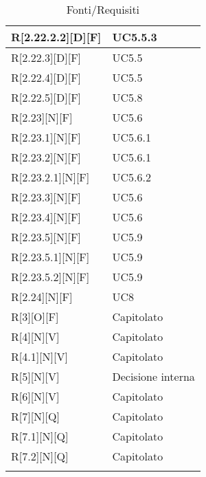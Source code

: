 \begin{longtable}{X | X}
\hline
R[2.22.2.2][D][F] & UC5.5.3 \\
\hline
R[2.22.3][D][F] & UC5.5 \\
\hline
R[2.22.4][D][F] & UC5.5 \\
\hline
R[2.22.5][D][F] & UC5.8 \\
\hline
R[2.23][N][F] & UC5.6 \\
\hline
R[2.23.1][N][F] & UC5.6.1 \\
\hline
R[2.23.2][N][F] & UC5.6.1 \\
\hline
R[2.23.2.1][N][F] & UC5.6.2 \\
\hline
R[2.23.3][N][F] & UC5.6 \\
\hline
R[2.23.4][N][F] & UC5.6 \\
\hline
R[2.23.5][N][F] & UC5.9 \\
\hline
R[2.23.5.1][N][F] & UC5.9 \\
\hline
R[2.23.5.2][N][F] & UC5.9 \\
\hline
R[2.24][N][F] & UC8 \\
\hline
R[3][O][F] & Capitolato \\
\hline
R[4][N][V] & Capitolato \\
\hline
R[4.1][N][V] & Capitolato \\
\hline
R[5][N][V] & Decisione interna \\
\hline
R[6][N][V] & Capitolato \\
\hline
R[7][N][Q] & Capitolato \\
\hline
R[7.1][N][Q] & Capitolato \\
\hline
R[7.2][N][Q] & Capitolato \\
\bottomrule
\caption{Fonti/Requisiti}
\end{longtable}   